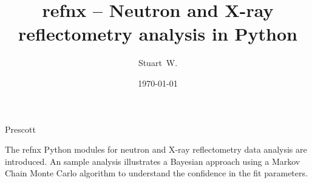 \documentclass[pdf,preprint]{iucr}
\begin{document}
\title{refnx -- Neutron and X-ray reflectometry analysis in Python}
\author[b]{Stuart~W.}{Prescott}


\date{\today}

\newcommand{\refnx}{\emph{refnx}}
\newcommand{\Objective}{\textbf{Objective}}
\newcommand{\GlobalObjective}{\textbf{GlobalObjective}}
\newcommand{\Parameter}{\textbf{Parameter}}
\newcommand{\Structure}{\textbf{Structure}}
\newcommand{\Slab}{\textbf{Slab}}
\newcommand{\Component}{\textbf{Component}}
\newcommand{\LipidLeaflet}{\textbf{LipidLeaflet}}
\newcommand{\Transform}{\textbf{Transform}}
\newcommand{\DataD}{\textbf{Data1D}}
\newcommand{\ReflectModel}{\textbf{ReflectModel}}
\newcommand{\CurveFitter}{\textbf{CurveFitter}}
\newcommand{\Spline}{\textbf{Spline}}
\newcommand{\conda}{\emph{conda}}
\newcommand{\corner}{\emph{corner}}
\newcommand{\MixedReflectModel}{\textbf{MixedReflectModel}}
\newcommand{\pip}{\emph{pip}}
\newcommand{\emcee}{\emph{emcee}}
\newcommand{\ptemcee}{\emph{ptemcee}}
\newcommand{\NumPy}{\emph{NumPy}}
\newcommand{\SciPy}{\emph{SciPy}}
\newcommand{\Cython}{\emph{Cython}}
\newcommand{\Jupyter}{\emph{Jupyter}}
\newcommand{\ipywidgets}{\emph{ipywidgets}}

\maketitle


\begin{synopsis}
The refnx Python modules for neutron and X-ray reflectometry data analysis are
introduced. An sample analysis illustrates a Bayesian approach using a
Markov Chain Monte Carlo algorithm to understand the confidence in the fit parameters.
\end{synopsis}
\end{document}
